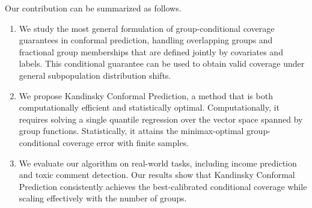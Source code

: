 
Our contribution can be summarized as follows.
\begin{enumerate}[leftmargin=*]


   \item  We study the most general formulation of group-conditional coverage guarantees in conformal prediction, handling overlapping groups and fractional group memberships that are defined jointly by covariates and labels. This conditional guarantee can be used to obtain valid coverage under general subpopulation distribution shifts.
    
\item We propose Kandinsky Conformal Prediction, a method that is both computationally efficient and statistically optimal. Computationally, it requires solving a single quantile regression over the vector space spanned by group functions. Statistically, it attains the minimax-optimal group-conditional coverage error with finite samples.

   \item We evaluate our algorithm on real-world tasks, including income prediction and toxic comment detection. Our results show that Kandinsky Conformal Prediction consistently achieves the best-calibrated conditional coverage while scaling effectively with the number of groups.

\end{enumerate}

